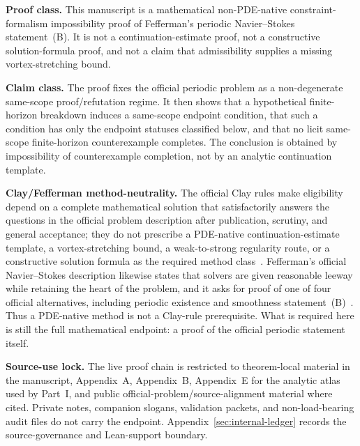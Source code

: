 \begin{tcolorbox}[breakable, title={Proof-class, claim-class, and source-use locks}, colback=yellow!3!white, colframe=yellow!45!black]
\textbf{Proof class.} This manuscript is a mathematical non-PDE-native constraint-formalism impossibility proof of Fefferman's periodic Navier--Stokes statement~(B). It is not a continuation-estimate proof, not a constructive solution-formula proof, and not a claim that admissibility supplies a missing vortex-stretching bound.

\medskip
\textbf{Claim class.} The proof fixes the official periodic problem as a non-degenerate same-scope proof/refutation regime. It then shows that a hypothetical finite-horizon breakdown induces a same-scope endpoint condition, that such a condition has only the endpoint statuses classified below, and that no licit same-scope finite-horizon counterexample completes. The conclusion is obtained by impossibility of counterexample completion, not by an analytic continuation template.

\medskip
\textbf{Clay/Fefferman method-neutrality.} The official Clay rules make eligibility depend on a complete mathematical solution that satisfactorily answers the questions in the official problem description after publication, scrutiny, and general acceptance; they do not prescribe a PDE-native continuation-estimate template, a vortex-stretching bound, a weak-to-strong regularity route, or a constructive solution formula as the required method class~\cite{cmi-millennium-rules}. Fefferman's official Navier--Stokes description likewise states that solvers are given reasonable leeway while retaining the heart of the problem, and it asks for proof of one of four official alternatives, including periodic existence and smoothness statement~(B)~\cite{fefferman-navierstokes-problem}. Thus a PDE-native method is not a Clay-rule prerequisite. What is required here is still the full mathematical endpoint: a proof of the official periodic statement itself.

\medskip
\textbf{Source-use lock.} The live proof chain is restricted to theorem-local material in the manuscript, Appendix~A, Appendix~B, Appendix~E for the analytic atlas used by Part~I, and public official-problem/source-alignment material where cited. Private notes, companion slogans, validation packets, and non-load-bearing audit files do not carry the endpoint. Appendix~\ref{sec:internal-ledger} records the source-governance and Lean-support boundary.
\end{tcolorbox}

